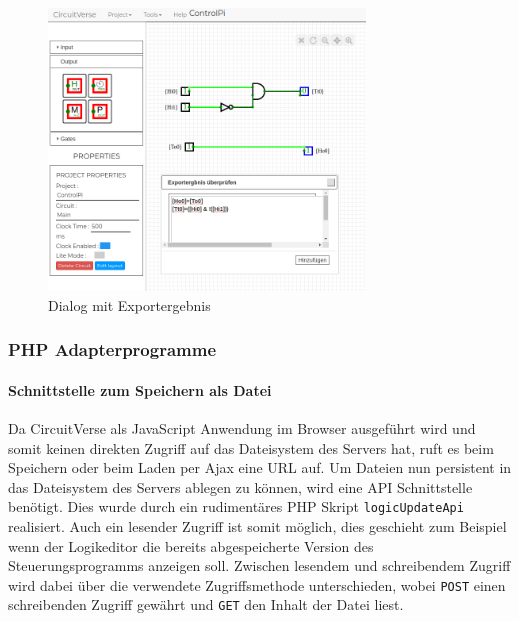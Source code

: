 \begin{figure}[H]
	\begin{center}
		\includegraphics[width=0.75\textwidth ,clip]{./images/circuitverseLogicBrightPrompt.png}
		\caption{Dialog mit Exportergebnis}
		\label{img:circuitVerseBrightPrompt}
	\end{center} 
\end{figure}




\subsubsection{PHP Adapterprogramme}\label{kap:ums:adapterphp}
\paragraph{Schnittstelle zum Speichern als Datei}\label{par:saveFile}
Da CircuitVerse als JavaScript Anwendung im Browser ausgeführt wird und somit keinen direkten Zugriff auf das Dateisystem des Servers hat, ruft es beim Speichern oder beim Laden per Ajax eine URL auf. Um Dateien nun persistent in das Dateisystem des Servers ablegen zu können, wird eine API Schnittstelle benötigt. Dies wurde durch ein rudimentäres PHP Skript \texttt{logicUpdateApi} realisiert. Auch ein lesender Zugriff ist somit möglich, dies geschieht zum Beispiel wenn der Logikeditor die bereits abgespeicherte Version des Steuerungsprogramms anzeigen soll. Zwischen lesendem und schreibendem Zugriff wird dabei über die verwendete Zugriffsmethode unterschieden, wobei \texttt{POST} einen schreibenden Zugriff gewährt und \texttt{GET} den Inhalt der Datei liest. 
